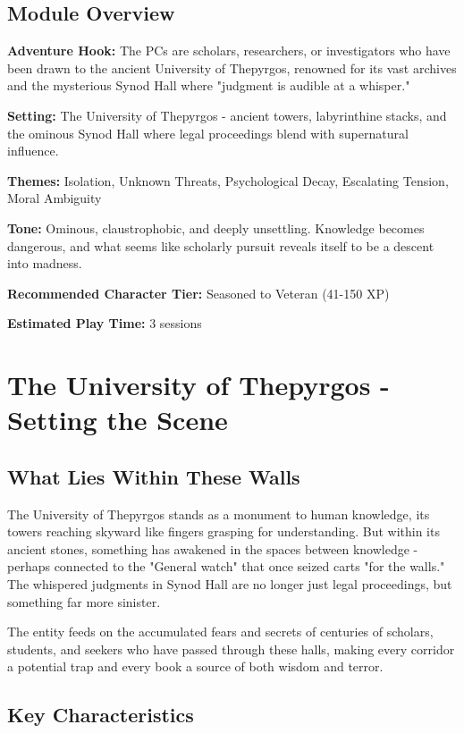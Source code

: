 \documentclass[11pt]{article}
\begin{document}
\subsection{Module Overview}

\textbf{Adventure Hook:} The PCs are scholars, researchers, or investigators who have been drawn to the ancient University of Thepyrgos, renowned for its vast archives and the mysterious Synod Hall where "judgment is audible at a whisper."

\textbf{Setting:} The University of Thepyrgos - ancient towers, labyrinthine stacks, and the ominous Synod Hall where legal proceedings blend with supernatural influence.

\textbf{Themes:} Isolation, Unknown Threats, Psychological Decay, Escalating Tension, Moral Ambiguity

\textbf{Tone:} Ominous, claustrophobic, and deeply unsettling. Knowledge becomes dangerous, and what seems like scholarly pursuit reveals itself to be a descent into madness.

\textbf{Recommended Character Tier:} Seasoned to Veteran (41-150 XP)

\textbf{Estimated Play Time:} 3 sessions

\section{The University of Thepyrgos - Setting the Scene}

\subsection{What Lies Within These Walls}

The University of Thepyrgos stands as a monument to human knowledge, its towers reaching skyward like fingers grasping for understanding. But within its ancient stones, something has awakened in the spaces between knowledge - perhaps connected to the "General watch" that once seized carts "for the walls." The whispered judgments in Synod Hall are no longer just legal proceedings, but something far more sinister.

The entity feeds on the accumulated fears and secrets of centuries of scholars, students, and seekers who have passed through these halls, making every corridor a potential trap and every book a source of both wisdom and terror.

\subsection{Key Characteristics}
\end{document}
